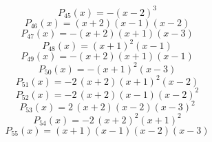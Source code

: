 \subitem \begin{dmath*}P_{45}(x) = -{\left(x - 2\right)}^{3} \end{dmath*}\vspace{-1.2cm}
\subitem \begin{dmath*}P_{46}(x) = {\left(x + 2\right)} {\left(x - 1\right)} {\left(x - 2\right)} \end{dmath*}\vspace{-1.2cm}
\subitem \begin{dmath*}P_{47}(x) = -{\left(x + 2\right)} {\left(x + 1\right)} {\left(x - 3\right)} \end{dmath*}\vspace{-1.2cm}
\subitem \begin{dmath*}P_{48}(x) = {\left(x + 1\right)}^{2} {\left(x - 1\right)} \end{dmath*}\vspace{-1.2cm}
\subitem \begin{dmath*}P_{49}(x) = -{\left(x + 2\right)} {\left(x + 1\right)} {\left(x - 1\right)} \end{dmath*}\vspace{-1.2cm}
\subitem \begin{dmath*}P_{50}(x) = -{\left(x + 1\right)}^{2} {\left(x - 3\right)} \end{dmath*}\vspace{-1.2cm}
\subitem \begin{dmath*}P_{51}(x) = -2 \, {\left(x + 2\right)} {\left(x + 1\right)}^{2} {\left(x - 2\right)} \end{dmath*}\vspace{-1.2cm}
\subitem \begin{dmath*}P_{52}(x) = -2 \, {\left(x + 2\right)} {\left(x - 1\right)} {\left(x - 2\right)}^{2} \end{dmath*}\vspace{-1.2cm}
\subitem \begin{dmath*}P_{53}(x) = 2 \, {\left(x + 2\right)} {\left(x - 2\right)} {\left(x - 3\right)}^{2} \end{dmath*}\vspace{-1.2cm}
\subitem \begin{dmath*}P_{54}(x) = -2 \, {\left(x + 2\right)}^{2} {\left(x + 1\right)}^{2} \end{dmath*}\vspace{-1.2cm}
\subitem \begin{dmath*}P_{55}(x) = {\left(x + 1\right)} {\left(x - 1\right)} {\left(x - 2\right)} {\left(x - 3\right)} \end{dmath*}\vspace{-1.2cm}
